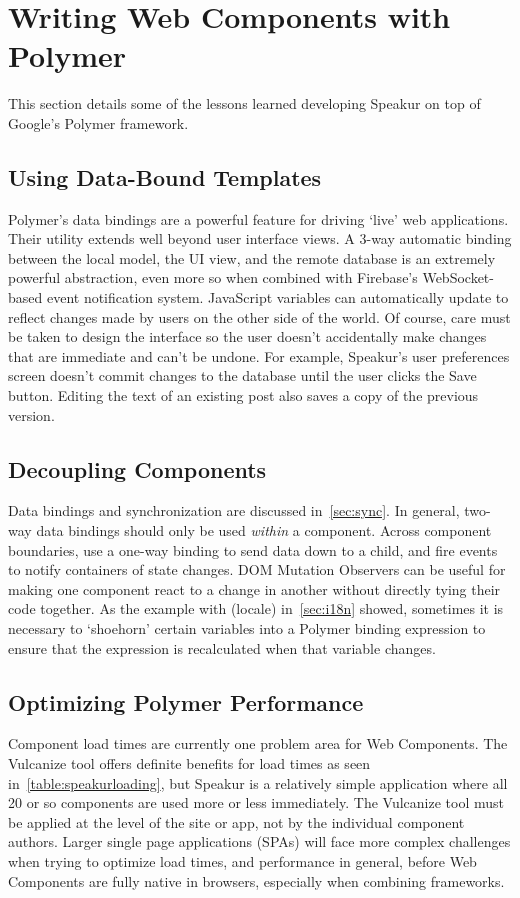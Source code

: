 \section{Writing Web Components with Polymer}
This section details some of the lessons learned developing Speakur on top of Google's Polymer framework.

\subsection{Using Data-Bound Templates}
Polymer's data bindings are a powerful feature for driving `live' web applications.
Their utility extends well beyond user interface views.
A 3-way automatic binding between the local model, the UI view, and the remote database is an extremely powerful abstraction,
even more so when combined with Firebase's 
Web\-Socket-based event notification system.
JavaScript variables can automatically update to reflect changes made by users on the other side of the world.
Of course, care must be taken to design the interface so the user doesn't accidentally make changes that are immediate and can't be undone. 
For example, Speakur's user preferences screen doesn't commit changes to the database until the user clicks the Save button.
Editing the text of an existing post also saves a copy of the previous version.

\subsection{Decoupling Components}
Data bindings and synchronization are discussed in~\cref{sec:sync}.
In general, two-way data bindings should only be used \textit{within} a component.
Across component boundaries, use a one-way binding to send data down to a child,
and fire events to notify containers of state changes.
DOM Mutation Observers can be useful for making one component react to a change in another without directly tying their code together.
As the example with  (locale) in~\cref{sec:i18n} showed, 
sometimes it is necessary to `shoehorn' certain variables into a Polymer binding expression 
to ensure that the expression is recalculated when that variable changes.

\subsection{Optimizing Polymer Performance}
Component load times are currently one problem area for Web Components.
The Vulcanize tool offers definite benefits for load times as seen in~\cref{table:speakurloading},
but Speakur is a relatively simple application where all 20 or so components are used more or less immediately.
The Vulcanize tool must be applied at the level of the site or app, not by the individual component authors.
Larger single page applications (SPAs) will face more complex challenges when trying to optimize load times, and performance in general,
before Web Components are fully native in browsers, especially when combining frameworks.

